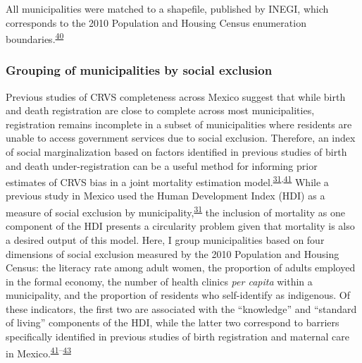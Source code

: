 \documentclass[
]{article}
\begin{document}
All municipalities were matched to a shapefile, published by INEGI, which corresponds to the 2010 Population and Housing Census enumeration boundaries.\textsuperscript{\protect\hyperlink{ref-INEGI2010b}{40}}

\hypertarget{grouping-of-municipalities-by-social-exclusion}{%
\subsubsection{Grouping of municipalities by social exclusion}\label{grouping-of-municipalities-by-social-exclusion}}

Previous studies of CRVS completeness across Mexico suggest that while birth and death registration are close to complete across most municipalities, registration remains incomplete in a subset of municipalities where residents are unable to access government services due to social exclusion. Therefore, an index of social marginalization based on factors identified in previous studies of birth and death under-registration can be a useful method for informing prior estimates of CRVS bias in a joint mortality estimation model.\textsuperscript{\protect\hyperlink{ref-Hernandez2012}{31},\protect\hyperlink{ref-Enciso2017}{41}} While a previous study in Mexico used the Human Development Index (HDI) as a measure of social exclusion by municipality,\textsuperscript{\protect\hyperlink{ref-Hernandez2012}{31}} the inclusion of mortality as one component of the HDI presents a circularity problem given that mortality is also a desired output of this model. Here, I group municipalities based on four dimensions of social exclusion measured by the 2010 Population and Housing Census: the literacy rate among adult women, the proportion of adults employed in the formal economy, the number of health clinics \emph{per capita} within a municipality, and the proportion of residents who self-identify as indigenous. Of these indicators, the first two are associated with the ``knowledge'' and ``standard of living'' components of the HDI, while the latter two correspond to barriers specifically identified in previous studies of birth registration and maternal care in Mexico.\textsuperscript{\protect\hyperlink{ref-Enciso2017}{41}--\protect\hyperlink{ref-Gamlin2020}{43}}
\end{document}
